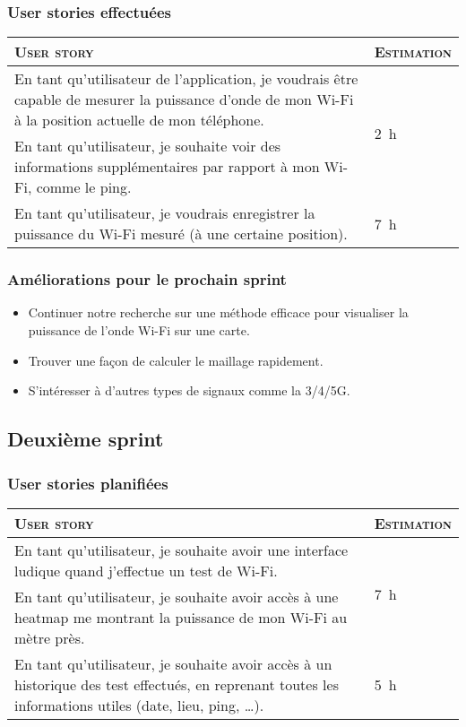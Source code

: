 \documentclass{elsarticle}
\newcommand{\est}[1]{\multirow{2}{*}{\SI{#1}{\hour}}}
\begin{document}
\subsubsection{User stories effectuées}
\begin{table}[H]
	\centering
	\begin{tabular}{p{14cm}m{2cm}}
		\toprule
		\textsc{User story} & \textsc{Estimation}\\
		\midrule
		En tant qu'utilisateur de l'application, je voudrais être capable de mesurer la puissance d'onde de mon Wi-Fi à la position actuelle de mon téléphone. & \est{2}\\
		\midrule
		En tant qu'utilisateur, je souhaite voir des informations supplémentaires par rapport à mon Wi-Fi, comme le ping. & \est{8}\\
		\midrule
		En tant qu'utilisateur, je voudrais enregistrer la puissance du Wi-Fi mesuré (à une certaine position). & \est{7}\\
		\bottomrule
	\end{tabular}
\end{table}

\subsubsection{Améliorations pour le prochain sprint}
\begin{itemize}
	\item Continuer notre recherche sur une méthode efficace pour visualiser la puissance de l’onde Wi-Fi sur une carte.
	\item Trouver une façon de calculer le maillage rapidement.
	\item S’intéresser à d’autres types de signaux comme la 3/4/5G.
\end{itemize}

\subsection{Deuxième sprint}
\subsubsection{User stories planifiées}
\begin{table}[H]
	\centering
	\begin{tabular}{p{14cm}m{2cm}}
		\toprule
		\textsc{User story} & \textsc{Estimation}\\
		\midrule
		En tant qu'utilisateur, je souhaite avoir une interface ludique quand j'effectue un test de Wi-Fi. & \est{7}\\
		\midrule
		En tant qu'utilisateur, je souhaite avoir accès à une heatmap me montrant la puissance de mon Wi-Fi au mètre près. & \est{30}\\
		\midrule
		En tant qu'utilisateur, je souhaite avoir accès à un historique des test effectués, en reprenant toutes les informations utiles (date, lieu, ping, \ldots). & \est{5}\\
		\bottomrule
	\end{tabular}
\end{table}
\end{document}
